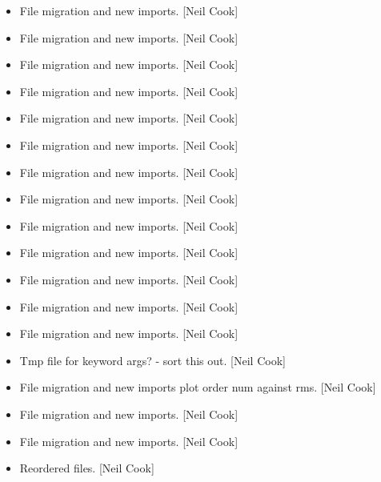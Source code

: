 \documentclass[a4paper,10pt,english]{report}
\begin{document}
\label{\detokenize{misc/changelog:id541}}\begin{itemize}
\item {} 
File migration and new imports. {[}Neil Cook{]}

\item {} 
File migration and new imports. {[}Neil Cook{]}

\item {} 
File migration and new imports. {[}Neil Cook{]}

\item {} 
File migration and new imports. {[}Neil Cook{]}

\item {} 
File migration and new imports. {[}Neil Cook{]}

\item {} 
File migration and new imports. {[}Neil Cook{]}

\item {} 
File migration and new imports. {[}Neil Cook{]}

\item {} 
File migration and new imports. {[}Neil Cook{]}

\item {} 
File migration and new imports. {[}Neil Cook{]}

\item {} 
File migration and new imports. {[}Neil Cook{]}

\item {} 
File migration and new imports. {[}Neil Cook{]}

\item {} 
File migration and new imports. {[}Neil Cook{]}

\item {} 
File migration and new imports. {[}Neil Cook{]}

\item {} 
Tmp file for keyword args? - sort this out. {[}Neil Cook{]}

\item {} 
File migration and new imports plot order num against rms. {[}Neil Cook{]}

\item {} 
File migration and new imports. {[}Neil Cook{]}

\item {} 
File migration and new imports. {[}Neil Cook{]}

\item {} 
Reordered files. {[}Neil Cook{]}

\end{itemize}
\end{document}
